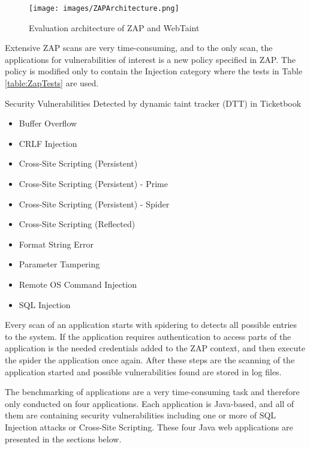 \begin{figure}[H]
    \centering
    \texttt{[image: images/ZAPArchitecture.png]}
    \caption{Evaluation architecture of ZAP and WebTaint}
    \label{fig:ZAP}
\end{figure}

Extensive ZAP scans are very time-consuming, and to the only scan, the applications for vulnerabilities of interest is a new policy specified in ZAP. The policy is modified only to contain the Injection category where the tests in Table \ref{table:ZapTests} are used.

\begin{table}[H]
  \centering
  \caption{Security Vulnerabilities Detected by dynamic taint tracker (DTT) in Ticketbook}
    \label{table:ZapTests}
    \begin{itemize}
        \item Buffer Overflow
        \item CRLF Injection
        \item Cross-Site Scripting (Persistent)
        \item Cross-Site Scripting (Persistent) - Prime
        \item Cross-Site Scripting (Persistent) - Spider
        \item Cross-Site Scripting (Reflected)
        \item Format String Error
        \item Parameter Tampering
        \item Remote OS Command Injection
        \item SQL Injection
    \end{itemize}
\end{table}

Every scan of an application starts with spidering to detects all possible entries to the system. If the application requires authentication to access parts of the application is the needed credentials added to the ZAP context, and then execute the spider the application once again. After these steps are the scanning of the application started and possible vulnerabilities found are stored in log files.

The benchmarking of applications are a very time-consuming task and therefore only conducted on four applications. Each application is Java-based, and all of them are containing security vulnerabilities including one or more of SQL Injection attacks or Cross-Site Scripting. These four Java web applications are presented in the sections below.



